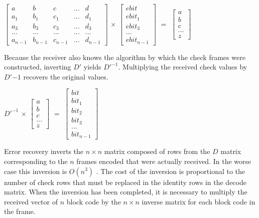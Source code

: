 \begin{center}
$
\begin{bmatrix} 
a   & b   & c   & ... & d   \\
a_1 & b_1 & c_1 & ... & d_1 \\
a_3 & b_3 & c_3 & ... & d_3 \\
... & ... & ... & ... & ... \\
a_{n-1} & b_{n-1} & c_{n-1} & ... & d_{n-1} 
\end{bmatrix}
$
$\times$
$
\begin{bmatrix} 
ebit \\ ebit_1  \\ ebit_3 \\ ... \\ ebit_{n-1} 
\end{bmatrix}
$
$=$
$
\begin{bmatrix} 
a \\ b \\ c \\ ... \\ z 
\end{bmatrix}
$
\end{center}
\vspace{0.5cm}
Because the receiver also knows the algorithm by which the check frames were constructed, inverting $D'$ yields $D'^{-1}$. Multiplying the received check values by $D'{-1}$ recovers the original values.

\begin{center}
$D'^{-1}$ 
$\times$
$
\begin{bmatrix} 
a \\ b \\ c \\ ... \\ z 
\end{bmatrix}
$
$=$
$
\begin{bmatrix} 
bit \\ bit_1 \\ bit_2 \\ bit_3 \\...\\bit_{n-1} 
\end{bmatrix} 
$
\end{center}

Error recovery inverts the $n \times n$ matrix composed of rows from the $D$ matrix corresponding to the $n$ frames encoded that were
actually received. In the worse case this inversion is $O(n^3)$ . The cost of
the inversion is proportional to the number of check rows that must be replaced
in the identity rows in the decode matrix. When the inversion has been completed,
it is necessary to multiply the received vector of $n$ block code by the $n \times n$ inverse matrix for each block code in the frame. 


